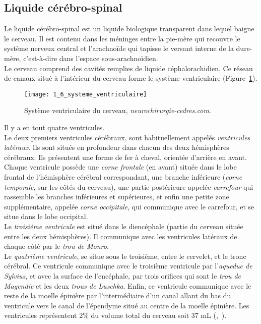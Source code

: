 \subsection{Liquide cérébro-spinal}
Le liquide cérébro-spinal est un liquide biologique transparent dans lequel baigne le cerveau. Il est contenu dans les méninges entre la pie-mère qui recouvre le système nerveux central et l’arachnoïde qui tapisse le versant interne de la dure-mère, c’est-à-dire dans l’espace sous-arachnoïdien.\\
Le cerveau comprend des cavités remplies de liquide céphalorachidien. Ce réseau de canaux situé à l’intérieur du cerveau forme le système ventriculaire (Figure~\ref{fig:1_6_systeme_ventriculaire}).
\begin{figure}[!t]
\centering
\texttt{[image: 1\_6\_systeme\_ventriculaire]}
\caption{Système ventriculaire du cerveau,  {\em neurochirurgie-cedres.com}. }
\label{fig:1_6_systeme_ventriculaire}	
\end{figure}
Il y a en tout quatre ventricules.\\
Le deux premiers ventricules cérébraux, sont habituellement appelés {\em ventricules latéraux}. Ils sont situés en profondeur dans chacun des deux hémisphères cérébraux. Ils présentent une forme de fer à cheval, orientée d'arrière en avant. Chaque ventricule possède une {\em corne frontale} (en avant) située dans le lobe frontal de l'hémisphère cérébral correspondant, une branche inférieure ({\em corne temporale}, sur les côtés du cerveau), une partie postérieure appelée {\em carrefour} qui rassemble les branches inférieures et supérieures, et enfin une petite zone supplémentaire, appelée {\em corne occipitale}, qui communique avec le carrefour, et se situe dans le lobe occipital.\\
Le {\em troisième ventricule} est situé dans le diencéphale (partie du cerveau située entre les deux hémisphères). Il communique avec les ventricules latéraux de chaque côté par le {\em trou de Monro}.\\
Le {\em quatrième ventricule}, se situe sous le troisième, entre le cervelet, et le tronc cérébral. Ce ventricule communique avec le troisième ventricule par l'{\em aqueduc de Sylvius}, et avec la surface de l'encéphale, par trois orifices qui sont le {\em trou de Magendie} et les deux {\em trous de Luschka}. Enfin, ce ventricule communique avec le reste de la moelle épinière par l'intermédiaire d'un canal allant du bas du ventricule vers le canal de l'épendyme situé au centre de la moelle épinière.
Les ventricules représentent 2\% du volume total du cerveau soit 37 mL (\cite{Akdogan2010},~\cite{Ott2010}).
